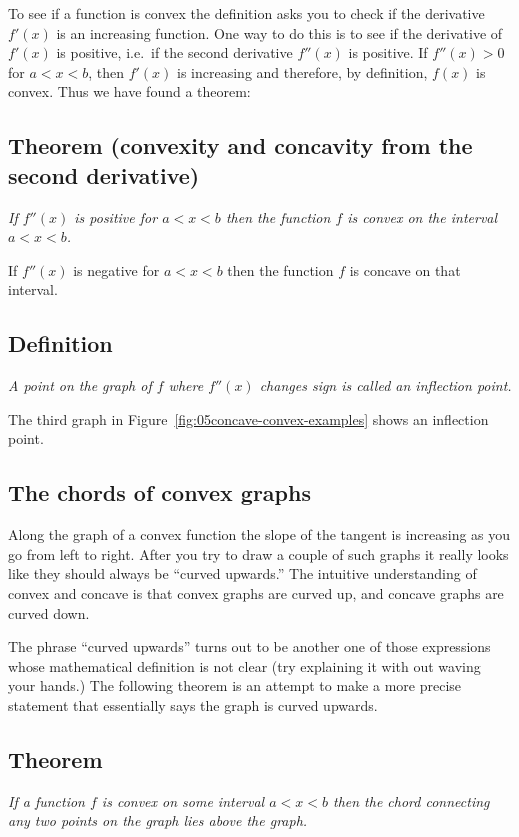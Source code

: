 To see if a function is convex the definition asks you to check if the
derivative $f'(x)$ is an increasing function.  One way to do this is to see if
the derivative of $f'(x)$ is positive, i.e.~if the second derivative $f''(x)$ is
positive.  If $f''(x)>0$ for $a<x<b$, then $f'(x)$ is increasing and therefore, by
definition, $f(x)$ is convex.  Thus we have found a theorem:

\subsection{Theorem (convexity and concavity from the second derivative)}
\itshape If $f''(x)$ is positive for $a<x<b$ then the function $f$ is convex on
the interval $a<x<b$.

If $f''(x)$ is negative for $a<x<b$ then the function $f$ is concave on that
interval.\upshape\smallskip



\subsection{Definition}
\itshape%
A point on the graph of $f$ where $f''(x)$ changes sign is called an
\emph{inflection point}.\upshape\smallskip

The third graph in Figure~\ref{fig:05concave-convex-examples} shows an inflection
point.

\subsection{The chords of convex graphs}
Along the graph of a convex function the slope of the tangent is increasing as
you go from left to right.  After you try to draw a couple of such graphs it
really looks like they should always be ``curved upwards.''   The intuitive
understanding of convex and concave is that convex graphs are curved up, and
concave graphs are curved down.

The phrase ``curved upwards'' turns out to be another one of those expressions
whose mathematical definition is not clear (try explaining it with out waving
your hands.)  The following theorem is an attempt to make a more precise
statement that essentially says the graph is curved upwards.

\subsection*{Theorem}
\itshape If a function $f$ is convex on some interval
$a<x<b$ then the chord connecting any two points on the graph lies
above the graph.  \upshape\smallskip

